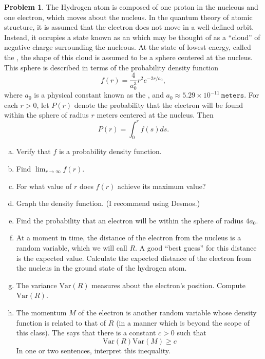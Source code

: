 \documentclass[10pt]{article}
\theoremstyle{definition}
\newtheorem{problem}[theorem]{Problem}
\newcommand{\1}[1]{\textbf{1}_{\left[#1\right]}} %
\def\Var{\mathrm{Var}} %
\newcommand{\dempfcolor}[1]{{\color{RoyalBlue}#1}}
\newcommand{\demph}[1]{\dempfcolor{{\sl #1}}}
\begin{document}
\begin{problem}
  The Hydrogen atom is composed of one proton in the nucleous and one
  electron, which moves about the nucleus. In the quantum theory of atomic
  structure, it is assumed that the electron does not move in a well-defined
  orbit. Instead, it occupies a state known as an \demph{orbital} which may be
  thought of as a ``cloud'' of negative charge surrounding the nucleous. At the
  state of lowest energy, called the \demph{ground state}, the shape of this
  cloud is assumed to be a sphere centered at the nucleus. This sphere is
  described in terms of the probability density function
  \begin{equation*}
    f(r) = \frac{4}{a_{0}^{3}}r^{2}e^{-2r/a_{0}},
  \end{equation*}
  where $a_{0}$ is a physical constant known as the \demph{Bohr radius}, and
  $a_{0} \approx 5.29 \times 10^{-11} \ \mathtt{meters}.$
  For each $r>0$, let $P(r)$ denote the probability that the electron will be
  found within the sphere of radius $r$ meters centered at the nucleus. Then 
  \begin{equation*}
    P(r) = \int_{0}^{r}f(s) ds.
  \end{equation*}
  \begin{enumerate}[(a)]
    \item Verify that $f$ is a probability density function.
    \item Find $\lim_{r\to\infty} f(r)$.
    \item For what value of $r$ does $f(r)$ achieve its maximum value?
    \item Graph the density function. (I recommend using Desmos.)
    \item Find the probability that an electron will be within the sphere of
    radius $4a_{0}$.
    \item At a moment in time, the distance of the electron from the nucleus
    is a random variable, which we will call $R$. A good ``best guess'' for
    this distance is the expected value. Calculate the expected distance of
    the electron from the nucleus in the ground state of the hydrogen atom.
    \item The variance $\Var(R)$ measures \demph{uncertainty} about the
    electron's position. Compute $\Var(R)$.
    \item The momentum $M$ of the electron is another random variable whose
    density function is related to that of $R$ (in a manner which is beyond
    the scope of this class). The \demph{Heisenberg uncertainty principle}
    says that there is a constant $c>0$ such that
    \begin{equation*}
      \Var(R)\Var(M)\geq c
    \end{equation*}
    In one or two sentences, interpret this inequality.
  \end{enumerate}
\end{problem}
\end{document}
